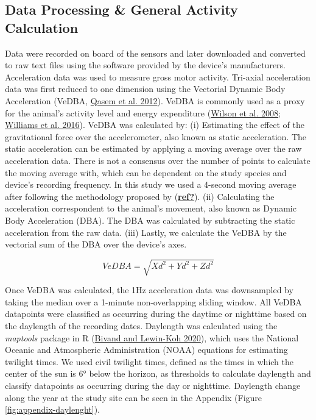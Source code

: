 \documentclass[english,msc,numbers,hidelinks]{coppe}
\begin{document}
  \hypertarget{data-processing-general-activity-calculation}{%
  \subsection{Data Processing \& General Activity Calculation}\label{data-processing-general-activity-calculation}}

  Data were recorded on board of the sensors and later downloaded and converted to raw text files using the software provided by the device's manufacturers. Acceleration data was used to measure gross motor activity. Tri-axial acceleration data was first reduced to one dimension using the Vectorial Dynamic Body Acceleration (VeDBA, \protect\hyperlink{ref-qasem2012}{Qasem et al. 2012}). VeDBA is commonly used as a proxy for the animal's activity level and energy expenditure (\protect\hyperlink{ref-wilson2008}{Wilson et al. 2008}; \protect\hyperlink{ref-williams2016}{Williams et al. 2016}). VeDBA was calculated by: (i) Estimating the effect of the gravitational force over the accelerometer, also known as static acceleration. The static acceleration can be estimated by applying a moving average over the raw acceleration data. There is not a consensus over the number of points to calculate the moving average with, which can be dependent on the study species and device's recording frequency. In this study we used a 4-second moving average after following the methodology proposed by (\protect\hyperlink{ref-ref}{\textbf{ref?}}). (ii) Calculating the acceleration correspondent to the animal's movement, also known as Dynamic Body Acceleration (DBA). The DBA was calculated by subtracting the static acceleration from the raw data. (iii) Lastly, we calculate the VeDBA by the vectorial sum of the DBA over the device's axes.

  \[ VeDBA = \sqrt{Xd^2 + Yd^2 + Zd^2} \]

  Once VeDBA was calculated, the 1Hz acceleration data was downsampled by taking the median over a 1-minute non-overlapping sliding window. All VeDBA datapoints were classified as occurring during the daytime or nighttime based on the daylength of the recording dates. Daylength was calculated using the \emph{maptools} package in R (\protect\hyperlink{ref-bivand2020}{Bivand and Lewin-Koh 2020}), which uses the National Oceanic and Atmospheric Administration (NOAA) equations for estimating twilight times. We used civil twilight times, defined as the times in which the center of the sun is 6° below the horizon, as thresholds to calculate daylength and classify datapoints as occurring during the day or nighttime. Daylength change along the year at the study site can be seen in the Appendix (Figure \ref{fig:appendix-daylenght}).
\end{document}
